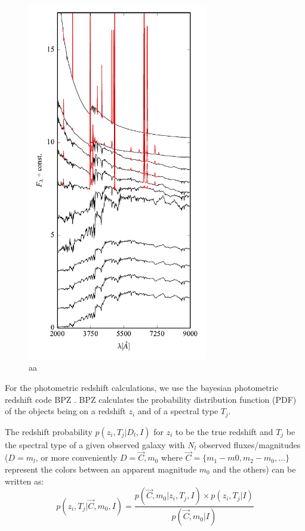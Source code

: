 \documentclass[9pt]{memoir}
\begin{document}
\begin{figure}
\begin{adjustwidth*}{1in}{0pt}
\centering
\includegraphics[width=0.7\textwidth]{figures/bpz_templates.pdf}
\end{adjustwidth*}
\caption{aa}
\label{fig:bpz_templates}
\end{figure}

For the photometric redshift calculations, we use the bayesian photometric redshift code BPZ \citep{Benitez.2000a}. BPZ calculates the probability distribution function (PDF) of the objects being on a redshift $z_i$ and of a spectral type $T_j$.

The redshift probability $p(z_i, T_j|D_l,I)$ for $z_i$ to be the true redshift and $T_j$ be the spectral type of a given observed galaxy with $N_l$ observed fluxes/magnitudes ($D = m_l$, or more conveniently $D = \vec{C}, m_0$ where $\vec{C} = \{m_1 - m0, m_2 - m_0, \ldots\}$ represent the colors between an apparent magnitude $m_0$ and the others)  can be written as:
\begin{equation}
p(z_i,T_j|\vec{C}, m_0,  I) = \frac{p(\vec{C}, m_0|z_i,T_j,I) \times p(z_i, T_j|I)}{p(\vec{C}, m_0|I)}
\end{equation}
\end{document}
